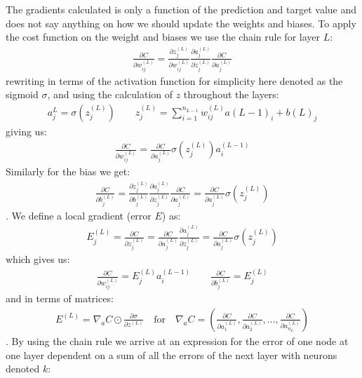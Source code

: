 \documentclass[11pt]{article}
\begin{document}
The gradients calculated is only a function of the prediction and target value and does not say anything on how we should update the weights and biases. To apply the cost function on the weight and biases we use the chain rule for layer $L$:
\begin{align*}
    \frac{\partial C}{\partial w^{(L)}_{ij}}  = \frac{\partial z^{(L)}_j}{\partial w^{(L)}_{ij}}  \frac{\partial a^{(L)}_{j}}{\partial z^{(L)}_j}  \frac{\partial C}{\partial a^{(L)}_j}
\end{align*}
rewriting in terms of the activation function for simplicity here denoted as the sigmoid $\sigma$, and using the calculation of $z$ throughout the layers:
\begin{align*}
    a_j^L = \sigma(z_j^{(L)}) \quad\quad z_j^{(L)} = \sum_{i=1}^{n_{L-1}}w^{(L)}_{ij}a{(L-1)}_{i} + b{(L)}_{j}
\end{align*}
giving us:
\begin{align*}
    \frac{\partial C}{\partial w^{(L)}_{ij}} = \frac{\partial C}{\partial a^{(L)}_{j}}\sigma(z_j^{(L)})a_i^{(L-1)}
\end{align*}
Similarly for the bias we get:
\begin{align*}
    \frac{\partial C}{\partial b^{(L)}_{j}} = \frac{\partial z^{(L)}_j}{\partial b^{(L)}_{j}}  \frac{\partial a^{(L)}_{j}}{\partial z^{(L)}_j}  \frac{\partial C}{\partial a^{(L)}_j} =
    \frac{\partial C}{\partial a^{(L)}_{j}}\sigma(z_j^{(L)})
\end{align*}.
We define a local gradient (error $E$) as:
\begin{align*}
    E_j^{(L)} = \frac{\partial C }{\partial z_j^{(L)}} = \frac{\partial C }{\partial a_j^{(L)}}\frac{\partial a_j^{(L)} }{\partial z_j^{(L)}} = \frac{\partial C }{\partial a_j^{(L)}} \sigma(z_j^{(L)})
\end{align*}
which gives us:
\begin{align*}
    \frac{\partial C }{\partial w_{ij}^{(L)}} = E_j^{(L)} a_i^{(L-1)} \quad\quad
    \frac{\partial C }{\partial b_{j}^{(L)}} = E_j^{(L)}
\end{align*}
and in terms of matrices:
\begin{align*}
    E^{(L)} = \nabla_a C \odot \frac{\partial \sigma }{\partial z^{(L)}} \quad \text{for} \quad \nabla_a C = \left(\frac{\partial C }{\partial a_1^{(L)}}, \frac{\partial C }{\partial a_2^{(L)}},..., \frac{\partial C }{\partial a_{n_L}^{(L)}}\right)
\end{align*}.
By using the chain rule we arrive at an expression for the error of one node at one layer dependent on a sum of all the errors of the next layer with neurons denoted $k$:
\end{document}
